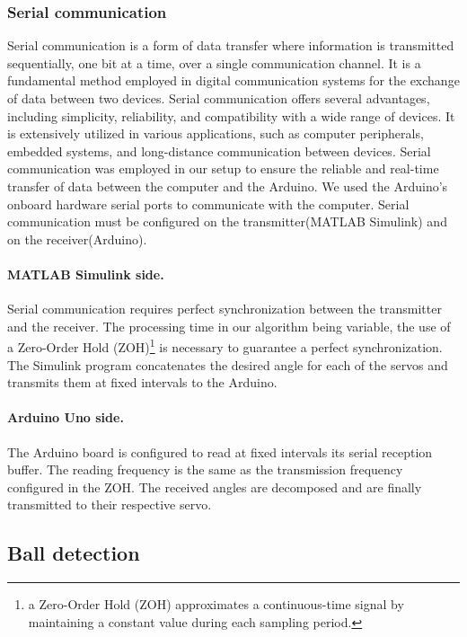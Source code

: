 \subsubsection{Serial communication}
Serial communication is a form of data transfer where information is transmitted sequentially, one bit at a time, over a single communication channel. It is a fundamental method employed in digital communication systems for the exchange of data between two devices. Serial communication offers several advantages, including simplicity, reliability, and compatibility with a wide range of devices. It is extensively utilized in various applications, such as computer peripherals, embedded systems, and long-distance communication between devices.
\newline
Serial communication was employed in our setup to ensure the reliable and real-time transfer of data between the computer and the Arduino. We used the Arduino's onboard hardware serial ports to communicate with the computer.
Serial communication must be configured on the transmitter(MATLAB Simulink) and on the receiver(Arduino).\newline
\paragraph{MATLAB Simulink side.}
Serial communication requires perfect synchronization between the transmitter and the receiver. The processing time in our algorithm being variable, the use of a Zero-Order Hold (ZOH)\footnote{a Zero-Order Hold (ZOH) approximates a continuous-time signal by maintaining a constant value during each sampling period. } is necessary to guarantee a perfect synchronization. The Simulink program concatenates the desired angle for each of the servos and transmits them at fixed intervals to the Arduino.

\paragraph{Arduino Uno side.}
The Arduino board is configured to read at fixed intervals its serial reception buffer. The reading frequency is the same as the transmission frequency configured in the ZOH. The received angles are decomposed and are finally transmitted to their respective servo.



\subsection{Ball detection}
